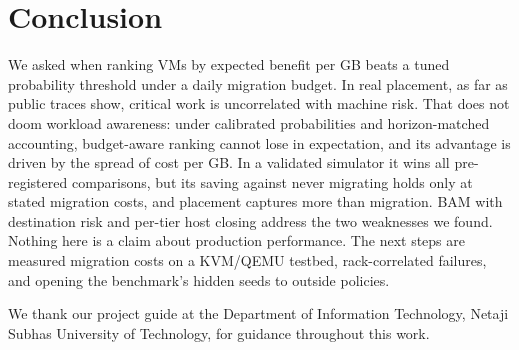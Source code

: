 \documentclass[pdflatex,sn-mathphys-num,iicol]{sn-jnl}
\theoremstyle{thmstyleone}%
\theoremstyle{thmstylethree}%
\begin{document}
\section{Conclusion}\label{sec:conclusion}

We asked when ranking VMs by expected benefit per GB beats a tuned probability threshold under a
daily migration budget. In real placement, as far as public traces show, critical work is
uncorrelated with machine risk. That does not doom workload awareness: under calibrated
probabilities and horizon-matched accounting, budget-aware ranking cannot lose in expectation, and
its advantage is driven by the spread of cost per GB. In a validated simulator it wins all
\VFamilySize{} pre-registered comparisons, but its saving against never migrating holds only at
stated migration costs, and placement captures more than migration. BAM with destination risk and
per-tier host closing address the two weaknesses we found. Nothing here is a claim about
production performance. The next steps are measured migration costs on a KVM/QEMU testbed,
rack-correlated failures, and opening the benchmark's hidden seeds to outside policies.

\backmatter

We thank our project guide at the Department of Information Technology, Netaji Subhas University
of Technology, for guidance throughout this work.
\end{document}
